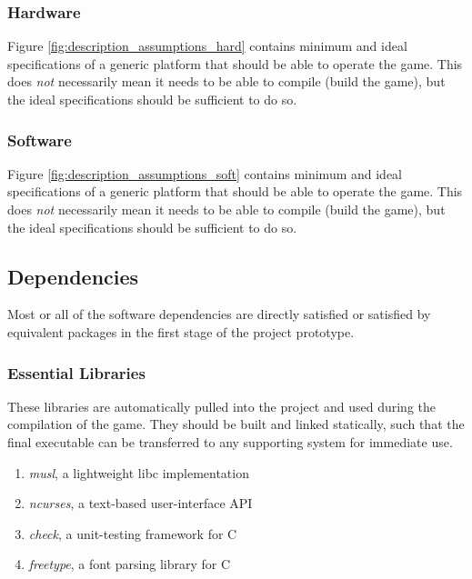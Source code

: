 \documentclass[letterpaper]{article}
\begin{document}
\subsubsection{Hardware}
\label{sec:description_assumptions_hard}

Figure \cref{fig:description_assumptions_hard} contains minimum
and ideal specifications of a generic platform that should be
able to operate the game. This does \emph{not} necessarily mean
it needs to be able to compile (build the game), but the ideal
specifications should be sufficient to do so.

\subsubsection{Software}
\label{sec:description_assumptions_soft}

Figure \cref{fig:description_assumptions_soft} contains minimum
and ideal specifications of a generic platform that should be
able to operate the game. This does \emph{not} necessarily mean
it needs to be able to compile (build the game), but the ideal
specifications should be sufficient to do so.

\subsection{Dependencies}
\label{sec:description_dependencies}

Most or all of the software dependencies are directly satisfied
or satisfied by equivalent packages in the first stage of the
project prototype.

\subsubsection{Essential Libraries}
\label{sec:description_dependencies_essential}

These libraries are automatically pulled into the project and
used during the compilation of the game. They should be built
and linked statically, such that the final executable can be
transferred to any supporting system for immediate use.

\begin{enumerate}
    \item \emph{musl}, a lightweight libc implementation
          ~\cite{musl}
    \item \emph{ncurses}, a text-based user-interface API
          ~\cite{ncurses}
    \item \emph{check}, a unit-testing framework for C
          ~\cite{check}
    \item \emph{freetype}, a font parsing library for C
          ~\cite{freetype}
\end{enumerate}
\end{document}
